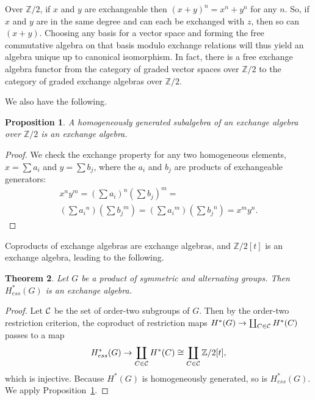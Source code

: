 \documentclass{article}
\theoremstyle{plain}
\newtheorem{theorem}{Theorem}
\newtheorem{proposition}[theorem]{Proposition}
\theoremstyle{definition}
\newcommand{\Z}{\mathbb{Z}}
\begin{document}
 Over $\Z/2$,  if $x$ and $y$ are exchangeable then $(x+y)^n = x^n + y^n$ for any $n$.
So, if $x$ and $y$ are in the same degree and
can each be exchanged with $z$, 
then so can $(x+y)$.  Choosing any basis for a vector
space and forming the free commutative algebra on that 
basis modulo exchange relations will thus yield an algebra unique up to canonical isomorphism.
In fact, there is a free exchange algebra functor
from the category of graded vector spaces over $\Z/2$ to 
the category of graded exchange algebras over $\Z/2$.


We also have the following.

\begin{proposition}\label{subalgebra}
    A homogeneously generated subalgebra of an exchange algebra over $\Z/2$ is an exchange algebra.
\end{proposition}

\begin{proof}
    We check the exchange property for any two homogeneous elements, $x = \sum a_i$ and $y = \sum b_j$, where the $a_i$ and $b_j$
    are products of exchangeable generators:  
\begin{multline*}
x^n y^m = \left(\sum a_i\right)^n \left(\sum b_j\right)^m = \\
\left(\sum {a_i}^n\right)\left(\sum {b_j}^m\right) = \left(\sum {a_i}^m\right)\left(\sum {b_j}^n\right) = x^m y^n.
\end{multline*}

\end{proof}
\bigskip

Coproducts of exchange algebras are exchange algebras, and $\Z/2[t]$
is an exchange algebra, leading to the following.

\begin{theorem}\label{areexchange}
Let $G$ be a product
of symmetric and alternating groups.
Then $H^*_{ess}(G )$ is an exchange algebra.
\end{theorem}

\begin{proof}
        Let $\cal{C}$ be the set of order-two subgroups of $G$.
    Then by the order-two restriction criterion,
    the coproduct of restriction maps $H^*(G) \to \coprod_{C \in \cal{C}} H^*(C)$ passes to a map 
    $$H^*_{ess}(G) \to \coprod_{C \in \cal{C}} H^*(C) \cong \coprod_{C \in \cal{C}} \Z/2[t],$$ which is injective.  Because $H^*(G)$
    is homogeneously generated, so is $H^*_{ess}(G)$.  We apply
    Proposition~\ref{subalgebra}.
\end{proof}
\end{document}
